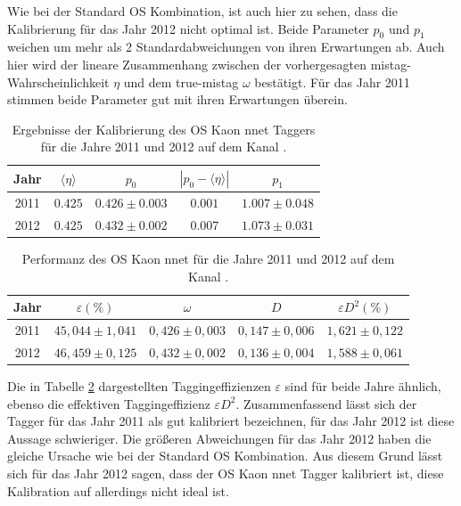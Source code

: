 Wie bei der Standard OS Kombination, ist auch hier zu sehen, dass die Kalibrierung für das Jahr \num{2012} nicht optimal ist. Beide Parameter $p_0$ und $p_1$ weichen um mehr als \num{2} Standardabweichungen von ihren Erwartungen ab. Auch hier wird der lineare Zusammenhang zwischen der vorhergesagten mistag-Wahrscheinlichkeit $\eta$ und dem true-mistag $\omega$ bestätigt. Für das Jahr \num{2011} stimmen beide Parameter gut mit ihren Erwartungen überein.  
\begin{table}[htbp]
	\centering
	\caption{Ergebnisse der Kalibrierung des OS Kaon nnet Taggers für die Jahre \num{2011} und \num{2012} auf dem Kanal \BdToDpi.}
	\label{tab:result_OSKaonNN}
	\begin{tabular}{ccccc}
	\toprule
       Jahr & $\langle\eta\rangle$ & $p_0$ & $\left|p_0-\langle\eta\rangle\right|$ & $p_1$ \\ 
       \midrule 
	2011 & $0{.}425$ & $0{.}426\pm0{.}003$ & $0{.}001$ & $1{.}007\pm0{.}048$ \\
   2012 & $0{.}425$ & $0{.}432\pm0{.}002$ & $0{.}007$ & $1{.}073\pm0{.}031$ \\ 
   \bottomrule
	\end{tabular}
\end{table}
\begin{table}[htbp]
	\centering
	\caption{Performanz des OS Kaon nnet für die Jahre \num{2011} und \num{2012} auf dem Kanal \mbox{\BdToDpi}.}
	\label{tab:performance_OSKaonNN}
	\begin{tabular}{ccccc}
	\toprule
       Jahr & $\varepsilon(\%)$ & $\omega$ & $D$ & $\varepsilon D^2(\%)$ \\ 
       \midrule
       2011 & $45{,}044\pm1{,}041$& $0{,}426\pm0{,}003$ & $0{,}147\pm0{,}006$ & $1{,}621\pm0{,}122$\\
     2012 & $46{,}459\pm0{,}125$& $0{,}432\pm0{,}002$ & $0{,}136\pm0{,}004$ & $1{,}588\pm0{,}061$\\ 
     \bottomrule
  \end{tabular}
\end{table}
Die in Tabelle \ref{tab:performance_OSKaonNN} dargestellten Taggingeffizienzen $\varepsilon$ sind für beide Jahre ähnlich, ebenso die effektiven Taggingeffizienz $\varepsilon D^2$. Zusammenfassend lässt sich der Tagger für das Jahr \num{2011} als gut kalibriert bezeichnen, für das Jahr \num{2012} ist diese Aussage schwieriger. Die größeren Abweichungen für das Jahr \num{2012} haben die gleiche Ursache wie bei der Standard OS Kombination. Aus diesem Grund lässt sich für das Jahr \num{2012} sagen, dass der OS Kaon nnet Tagger kalibriert ist, diese Kalibration auf \BdToDpi allerdings nicht ideal ist.   

